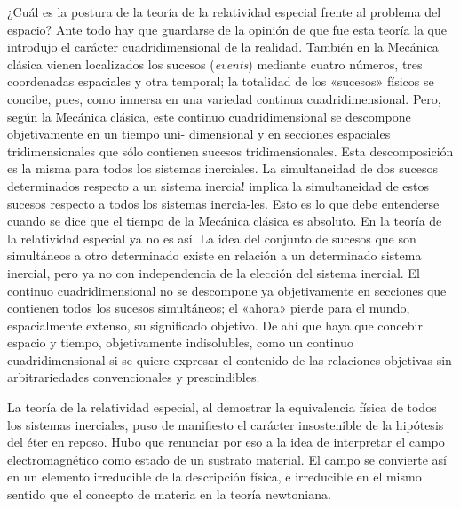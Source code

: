 \documentclass[spanish]{book}
\begin{document}
¿Cuál es la postura de la teoría de la relatividad especial frente al problema del
espacio? Ante todo hay que guardarse de la opinión de que fue esta teoría la que
introdujo el carácter cuadridimensional de la realidad. También en la Mecánica clásica
vienen localizados los sucesos (\textit{events}) mediante cuatro números, tres coordenadas
espaciales y otra temporal; la totalidad de los «sucesos» físicos se concibe, pues, como
inmersa en una variedad continua cuadridimensional. Pero, según la Mecánica clásica,
este continuo cuadridimensional se descompone objetivamente en un tiempo uni-
dimensional y en secciones espaciales tridimensionales que sólo contienen sucesos
tridimensionales. Esta descomposición es la misma para todos los sistemas inerciales.
La simultaneidad de dos sucesos determinados respecto a un sistema inercia! implica la
simultaneidad de estos sucesos respecto a todos los sistemas inercia-les. Esto es lo que
debe entenderse cuando se dice que el tiempo de la Mecánica clásica es absoluto. En
la teoría de la relatividad especial ya no es así. La idea del conjunto de sucesos que son
simultáneos a otro determinado existe en relación a un determinado sistema inercial,
pero ya no con independencia de la elección del sistema inercial. El continuo
cuadridimensional no se descompone ya objetivamente en secciones que contienen
todos los sucesos simultáneos; el «ahora» pierde para el mundo, espacialmente extenso,
su significado objetivo. De ahí que haya que concebir espacio y tiempo,
objetivamente indisolubles, como un continuo cuadridimensional si se quiere expresar
el contenido de las relaciones objetivas sin arbitrariedades convencionales y
prescindibles.

La teoría de la relatividad especial, al demostrar la equivalencia física de todos los
sistemas inerciales, puso de manifiesto el carácter insostenible de la hipótesis del éter
en reposo. Hubo que renunciar por eso a la idea de interpretar el campo
electromagnético como estado de un sustrato material. El campo se convierte así en
un elemento irreducible de la descripción física, e irreducible en el mismo sentido que
el concepto de materia en la teoría newtoniana.
\end{document}
